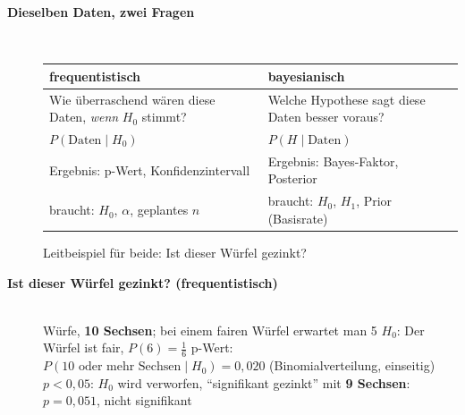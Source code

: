 \begin{description}
\item[{\rot\bf Dieselben Daten, zwei Fragen}]~\\[-\lblskip]
\begin{center}
\begin{tabular}{p{}p{}}
\toprule
\textbf{frequentistisch} & \textbf{bayesianisch} \\
\midrule
Wie überraschend wären diese Daten, \emph{wenn} $H_0$ stimmt? &
Welche Hypothese sagt diese Daten besser voraus? \\
$P(\text{Daten}\mid H_0)$ & $P(H\mid\text{Daten})$ \\
Ergebnis: p-Wert, Konfidenzintervall & Ergebnis: Bayes-Faktor, Posterior \\
braucht: $H_0$, $\alpha$, geplantes $n$ & braucht: $H_0$, $H_1$, Prior
(Basisrate) \\
\bottomrule
\end{tabular}
\end{center}
\bi
  \ite Leitbeispiel für beide: Ist dieser Würfel gezinkt?
\ei
\os{\newpage}

\item[{\rot\bf Ist dieser Würfel gezinkt? (frequentistisch)}]~\\[-\lblskip]
\bi
   Würfe, \textbf{10 Sechsen}; bei einem fairen Würfel erwartet
    man 5
  \ite $H_0$: Der Würfel ist fair, $P(6)=\tfrac16$
  \ite p-Wert: $P(\text{10 oder mehr Sechsen}\mid H_0) = 0{,}020$
    (Binomialverteilung, einseitig)
  \ite $p<0{,}05$: $H_0$ wird verworfen, \enquote{signifikant gezinkt}
  \ite mit \textbf{9 Sechsen}: $p=0{,}051$, nicht signifikant
\ei
{}
\os{\newpage}


\end{description}
